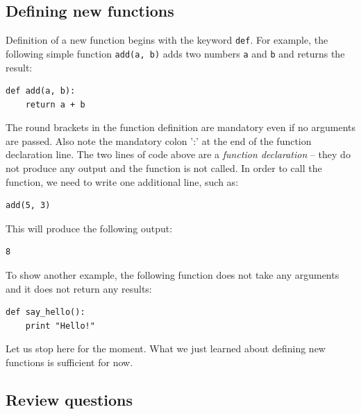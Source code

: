 \subsection{Defining new functions}

Definition of a new function begins with the keyword {\tt def}. For example, 
the following simple function {\tt add(a, b)} adds two numbers {\tt a} and {\tt b} 
and returns the result:

\begin{verbatim}
def add(a, b):
    return a + b
\end{verbatim}
The round brackets in the function definition are mandatory even if no arguments are passed.
Also note the mandatory colon ':' at the end of the function declaration line. The two lines of code above 
are a {\em function declaration} -- they do not produce any output and the function is not called. 
In order to call the function, we need to write one additional line, such as:

\begin{verbatim}
add(5, 3)
\end{verbatim}
This will produce the following output:

\begin{verbatim}
8
\end{verbatim}
To show another example, the following function does not take any arguments 
and it does not return any results:

\begin{verbatim}
def say_hello():
    print "Hello!"
\end{verbatim}
Let us stop here for the moment. What we just learned about defining new functions is 
sufficient for now.

\subsection{Review questions}

